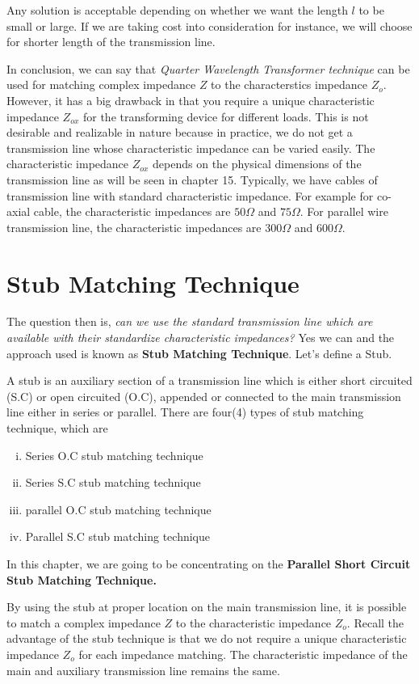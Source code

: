 \begin{enumerate}[(i)]
Any solution is acceptable depending on whether we want the length $l$ to be small or large. If we are taking cost into consideration for instance, we will choose for shorter length of the transmission line.

In conclusion, we can say that \textit{Quarter Wavelength Transformer technique} can be used for matching complex impedance $Z$ to the characterstics impedance $Z_o$. However, it has a big drawback in that you require a unique characteristic impedance $Z_{ox}$ for the transforming device for different loads. This is not desirable and realizable in nature because in practice, we do not get a transmission line whose characteristic impedance can be varied easily. The characteristic impedance $Z_{ox}$ depends on the physical dimensions of the transmission line as will be seen in chapter 15. Typically, we have cables of transmission line with standard characteristic impedance. For example for co-axial cable, the characteristic impedances are $50\Omega$ and $75\Omega$. For parallel wire transmission line, the characteristic impedances are $300\Omega$ and $600\Omega$.

\section{Stub Matching Technique}
The question then is, \emph{can we use the standard transmission line which are available with their standardize characteristic impedances?} Yes we can and the approach used is known as \textbf{Stub Matching Technique}. Let's define a Stub.

A stub is an auxiliary section of a transmission line which is either short circuited (S.C) or open circuited (O.C), appended or connected to the main transmission line either in series or parallel. There are four(4) types of stub matching technique, which are
\begin{enumerate}[(i)]
\item Series O.C stub matching technique
\item Series S.C stub matching technique
\item parallel O.C stub matching technique
\item Parallel S.C stub matching technique
\end{enumerate}
In this chapter, we are going to be concentrating on the \textbf{Parallel Short Circuit Stub Matching Technique.}

By using the stub at proper location on the main transmission line, it is possible to match a complex impedance $Z$ to the characteristic impedance $Z_o$.
Recall the advantage of the stub technique is that we do not require a unique characteristic impedance $Z_o$ for each impedance matching. The characteristic impedance of the main and auxiliary transmission line remains the same.


\end{enumerate}
